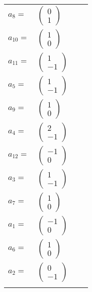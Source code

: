 \documentclass[1p]{elsarticle_modified}
\theoremstyle{definition}
\begin{document}
\begin{tabular}{m{7pt} m{180pt} m{7pt} m{180pt} }
\flushright $a_{8}=$&$\begin{pmatrix}0\\1\end{pmatrix}$ \\
\flushright $a_{10}=$&$\begin{pmatrix}1\\0\end{pmatrix}$ \\
\flushright $a_{11}=$&$\begin{pmatrix}1\\-1\end{pmatrix}$ \\
\flushright $a_{5}=$&$\begin{pmatrix}1\\-1\end{pmatrix}$ \\
\flushright $a_{9}=$&$\begin{pmatrix}1\\0\end{pmatrix}$ \\
\flushright $a_{4}=$&$\begin{pmatrix}2\\-1\end{pmatrix}$ \\
\flushright $a_{12}=$&$\begin{pmatrix}-1\\0\end{pmatrix}$ \\
\flushright $a_{3}=$&$\begin{pmatrix}1\\-1\end{pmatrix}$ \\
\flushright $a_{7}=$&$\begin{pmatrix}1\\0\end{pmatrix}$ \\
\flushright $a_{1}=$&$\begin{pmatrix}-1\\0\end{pmatrix}$ \\
\flushright $a_{6}=$&$\begin{pmatrix}1\\0\end{pmatrix}$ \\
\flushright $a_{2}=$&$\begin{pmatrix}0\\-1\end{pmatrix}$\\&\end{tabular}
\end{document}

